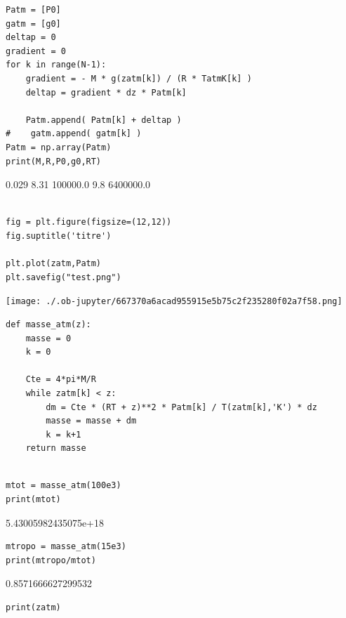 \documentclass[11pt]{article}
\begin{document}
\begin{verbatim}
Patm = [P0]
gatm = [g0]
deltap = 0
gradient = 0
for k in range(N-1):
    gradient = - M * g(zatm[k]) / (R * TatmK[k] )
    deltap = gradient * dz * Patm[k]
    
    Patm.append( Patm[k] + deltap )
#    gatm.append( gatm[k] )
Patm = np.array(Patm)
print(M,R,P0,g0,RT)
\end{verbatim}

0.029 8.31 100000.0 9.8 6400000.0

\begin{verbatim}

fig = plt.figure(figsize=(12,12))
fig.suptitle('titre')

plt.plot(zatm,Patm)
plt.savefig("test.png")

\end{verbatim}

\begin{center}
\texttt{[image: ./.ob-jupyter/667370a6acad955915e5b75c2f235280f02a7f58.png]}
\end{center}


\begin{verbatim}
def masse_atm(z):
    masse = 0
    k = 0
    
    Cte = 4*pi*M/R
    while zatm[k] < z:
        dm = Cte * (RT + z)**2 * Patm[k] / T(zatm[k],'K') * dz
        masse = masse + dm
        k = k+1
    return masse
\end{verbatim}

\begin{verbatim}

mtot = masse_atm(100e3)
print(mtot)

\end{verbatim}

5.43005982435075e+18



\begin{verbatim}
mtropo = masse_atm(15e3)
print(mtropo/mtot)
\end{verbatim}

0.8571666627299532


\begin{verbatim}
print(zatm)
\end{verbatim}
\end{document}

